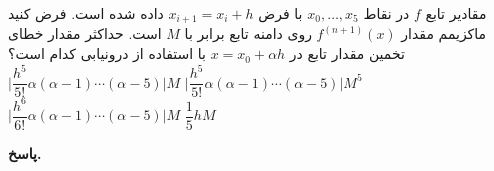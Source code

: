  مقادیر تابع 
\(f\)
 در نقاط
\(x_0, \ldots, x_5\)
با فرض
\(x_{i+1} = x_i + h\)
داده شده است. فرض کنید ماکزیمم مقدار 
\(f^{(n+1)} (x)\)
روی دامنه تابع برابر با 
\(M\)
است. حداکثر مقدار خطای تخمین مقدار تابع در 
\(x = x_0 + \alpha h\)
با استفاده از درونیابی    کدام  است؟
\mulchoice
	{\(\Big| \dfrac{h^5}{5!}\alpha(\alpha-1)\cdots (\alpha-5)\Big| M\)}
	{\(\Big| \dfrac{h^5}{5!}\alpha(\alpha-1)\cdots (\alpha-5)\Big| M^5\)}
	{\(\Big| \dfrac{h^6}{6!}\alpha(\alpha-1)\cdots (\alpha-5)\Big| M\)}
	{\(\dfrac{1}{5}hM\)}

\begin{answer}

	\textbf{پاسخ.}
	
\end{answer}
